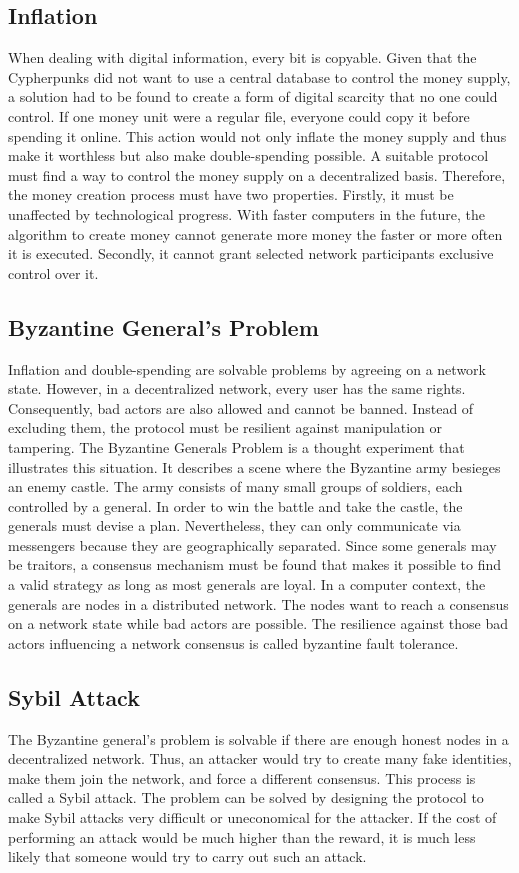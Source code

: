\subsection{Inflation}
When dealing with digital information, every bit is copyable.
Given that the Cypherpunks did not want to use a central database to control the money supply, a solution had to be found to create a form of digital scarcity that no one could control.
If one money unit were a regular file, everyone could copy it before spending it online.
This action would not only inflate the money supply and thus make it worthless but also make double-spending possible.
A suitable protocol must find a way to control the money supply on a decentralized basis.
Therefore, the money creation process must have two properties.
Firstly, it must be unaffected by technological progress.
With faster computers in the future, the algorithm to create money cannot generate more money the faster or more often it is executed.
Secondly, it cannot grant selected network participants exclusive control over it.


\subsection{Byzantine General's Problem}
Inflation and double-spending are solvable problems by agreeing on a network state.
However, in a decentralized network, every user has the same rights.
Consequently, bad actors are also allowed and cannot be banned.
Instead of excluding them, the protocol must be resilient against manipulation or tampering.
The Byzantine Generals Problem is a thought experiment that illustrates this situation.
It describes a scene where the Byzantine army besieges an enemy castle.
The army consists of many small groups of soldiers, each controlled by a general.
In order to win the battle and take the castle, the generals must devise a plan.
Nevertheless, they can only communicate via messengers because they are geographically separated.
Since some generals may be traitors, a consensus mechanism must be found that makes it possible to find a valid strategy as long as most generals are loyal.
In a computer context, the generals are nodes in a distributed network.
The nodes want to reach a consensus on a network state while bad actors are possible.
The resilience against those bad actors influencing a network consensus is called byzantine fault tolerance.
\cite{lamport2019byzantine}

\subsection{Sybil Attack}
The Byzantine general's problem is solvable if there are enough honest nodes in a decentralized network.
Thus, an attacker would try to create many fake identities, make them join the network, and force a different consensus.
This process is called a Sybil attack.
The problem can be solved by designing the protocol to make Sybil attacks very difficult or uneconomical for the attacker.
If the cost of performing an attack would be much higher than the reward, it is much less likely that someone would try to carry out such an attack.
\cite{Douceur2002}

